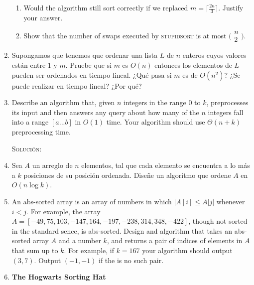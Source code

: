\documentclass[letterpaper,11pt]{article}
\begin{document}
\begin{enumerate}
\begin{enumerate}
        \item Would the algorithm still sort correctly if we replaced 
        $m = \lceil \frac{2n}{3}\rceil$. Justify your answer.

        \item Show that the number of swaps executed by \textsc{stupidsort} is
        at most $\big(\begin{smallmatrix} n \\ 2 \end{smallmatrix}\big)$.
    \end{enumerate}

    \item Supongamos que tenemos que ordenar una lista $L$ de $n$ enteros cuyos
    valores están entre $1$ y $m$. Pruebe que si $m$ es $O(n)$ entonces los 
    elementos de $L$ pueden ser ordenados en tiempo lineal. ¿Qué pasa si $m$ es 
    de $O(n^2)$? ¿Se puede realizar en tiempo lineal? ¿Por qué?

    \item Describe an algorithm that, given $n$ integers in the range $0$ to 
    $k$, preprocesses its input and then answers any query about how many of 
    the $n$ integers fall into a range $[a ... b]$ in $O(1)$ time. Your 
    algorithm should use $\Theta(n + k)$ preprocessing time.

    \textsc{Solución:}

    \item Sea $A$ un arreglo de $n$ elementos, tal que cada elemento se 
    encuentra a lo más a $k$ posiciones de su posición ordenada. Diseñe un 
    algoritmo que ordene $A$ en $O(n \log k)$.

    \item An abs-sorted array is an array of numbers in which $|A[i] \leq A[j|$
    whenever $i < j$. For example, the array $A = [-49, 75, 103, -147, 164, -197,
    -238, 314, 348, -422]$, though not sorted in the standard sence, is 
    abs-sorted. Design and algorithm that takes an abs-sorted array $A$ and a 
    number $k$, and returns a pair of indices of elements in $A$ that sum up to 
    $k$. For example, if $k = 167$ your algorithm should output $(3, 7)$. Output 
    $(-1, -1)$ if the is no such pair.

    \item \textbf{The Hogwarts Sorting Hat}


\end{enumerate}
\end{document}
